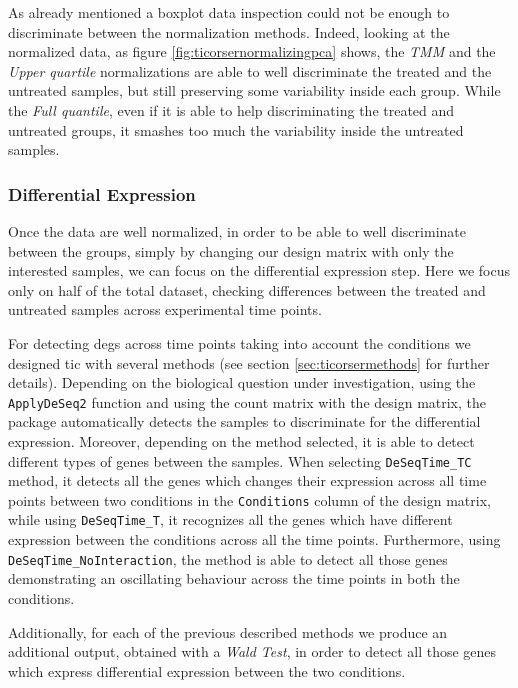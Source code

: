 As already mentioned a boxplot data inspection could not be enough to discriminate between the normalization methods. 
Indeed, looking at the normalized data, as figure \ref{fig:ticorsernormalizingpca} shows, the \textit{TMM} and the \textit{Upper quartile} normalizations are able to well discriminate the treated and the untreated samples, but still preserving some variability inside each group.
While the \textit{Full quantile}, even if it is able to help discriminating the treated and untreated groups, it smashes too much the variability inside the untreated samples.



\subsubsection{Differential Expression}
Once the data are well normalized, in order to be able to well discriminate between the groups, simply by changing our design matrix with only the interested samples, we can focus on the differential expression step.
Here we focus only on half of the total dataset, checking differences between the treated and untreated samples across experimental time points.

For detecting \glspl{deg} across time points taking into account the conditions we designed \gls{tic} with several methods (see section \ref{sec:ticorsermethods} for further details).
Depending on the biological question under investigation, using the \lstinline!ApplyDeSeq2! function and using the count matrix with the design matrix, the package automatically detects the samples to discriminate for the differential expression.
Moreover, depending on the method selected, it is able to detect different types of genes between the samples.
When selecting \lstinline!DeSeqTime_TC! method, it detects all the genes which changes their expression across all time points between two conditions in the \lstinline!Conditions! column of the design matrix, while using \lstinline!DeSeqTime_T!, it recognizes all the genes which have different expression between the conditions across all the time points. 
Furthermore, using \lstinline!DeSeqTime_NoInteraction!, the method is able to detect all those genes demonstrating an oscillating behaviour across the time points in both the conditions.

Additionally, for each of the previous described methods we produce an additional output, obtained with a \textit{Wald Test}, in order to detect all those genes which express differential expression between	the two conditions.

